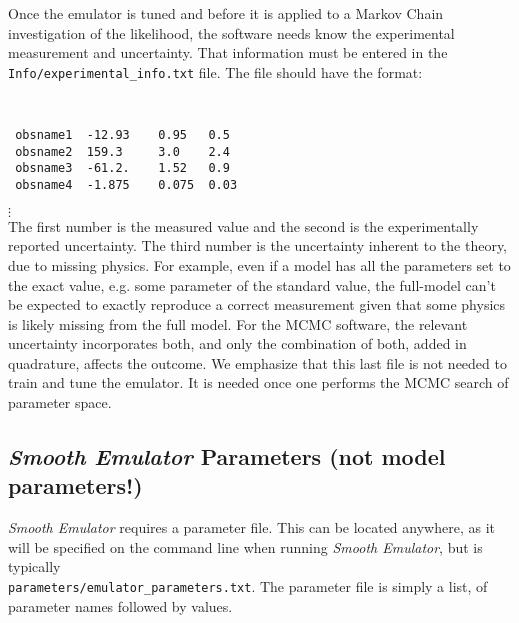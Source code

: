 \documentclass[UserManual.tex]{subfiles}
\begin{document}
\begin{enumerate}
Once the emulator is tuned and before it is applied to a Markov Chain investigation of the likelihood, the software needs know the experimental measurement and uncertainty. That information must be entered in the {\tt Info/experimental\_info.txt} file. The file should have the format:
{\tt
\begin{verbatim}
 obsname1  -12.93    0.95   0.5
 obsname2  159.3     3.0    2.4
 obsname3  -61.2.    1.52   0.9
 obsname4  -1.875    0.075  0.03
\end{verbatim}}
\vspace*{-16pt}
 \hspace*{28pt}$\vdots$\\
The first number is the measured value and the second is the experimentally reported uncertainty. The third number is the uncertainty inherent to the theory, due to missing physics. For example, even if a model has all the parameters set to the exact value, e.g. some parameter of the standard value, the full-model can't be expected to exactly reproduce a correct measurement given that some physics is likely missing from the full model. For the MCMC software, the relevant uncertainty incorporates both, and only the combination of both, added in quadrature, affects the outcome. We emphasize that this last file is not needed to train and tune the emulator. It is needed once one performs the MCMC search of parameter space. 


\end{enumerate}

\subsection{{\it Smooth Emulator} Parameters (not model parameters!)}

{\it Smooth Emulator} requires a parameter file. This can be located anywhere, as it will be specified on the command line when running {\it Smooth Emulator}, but is typically\\{\tt parameters/emulator\_parameters.txt}. The parameter file is simply a list, of parameter names followed by values. 
\end{document}
